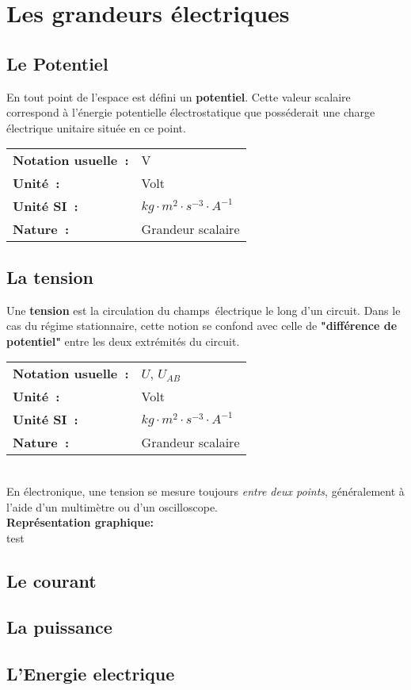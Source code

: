 \chapter{Les grandeurs électriques}

\section{Le Potentiel}

En tout point de l'espace est défini un \textbf{potentiel}. Cette valeur scalaire correspond à l'énergie potentielle électrostatique que posséderait une charge électrique unitaire située en ce point. \\

\begin{tabular}{ll}
\textbf{Notation usuelle~:} & V \\
\textbf{Unité~:} & Volt \\
\textbf{Unité SI~:} & ${kg} \cdot m^2 \cdot {s}^{-3} \cdot A^{-1}$ \\
\textbf{Nature~:} & Grandeur scalaire \\
\end{tabular}

\section{La tension}

Une \textbf{tension} est la circulation du champs électrique le long d'un circuit. Dans le cas du régime stationnaire, cette notion se confond avec celle de \textbf{"différence de potentiel"} entre les deux extrémités du circuit. \\

\begin{tabular}{ll}
\textbf{Notation usuelle~:} & $U$, $U_{AB}$ \\
\textbf{Unité~:} & Volt \\
\textbf{Unité SI~:} & ${kg} \cdot m^2 \cdot {s}^{-3} \cdot A^{-1}$ \\
\textbf{Nature~:} & Grandeur scalaire \\
\end{tabular} \\

En électronique, une tension se mesure toujours \emph{entre deux points}, généralement à l'aide d'un multimètre ou d'un oscilloscope. \\

\textbf{ Représentation graphique: } \\



test

\section{Le courant}

\section{La puissance}

\section{L'Energie electrique}

